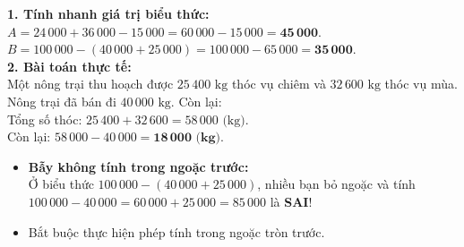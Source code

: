 \documentclass[11pt,a4paper]{article}
\begin{document}
\vspace{-2.5mm}
\noindent
\begin{minipage}[t]{0.49\textwidth}\vspace{0pt}
\begin{tcolorbox}[
  enhanced,
  colback=green!4!white,
  colframe=green!60!black,
  arc=2mm, boxrule=0.8pt,
  left=2mm, right=2mm, top=1.8mm, bottom=1.8mm,
  title={\footnotesize\bfseries\color{white}\faCheckCircle\ Ví dụ thực hành chuẩn mực}
]
{\footnotesize
\textbf{1. Tính nhanh giá trị biểu thức:}\\
$A = 24\,000 + 36\,000 - 15\,000 = 60\,000 - 15\,000 = \mathbf{45\,000}$.\\
$B = 100\,000 - (40\,000 + 25\,000) = 100\,000 - 65\,000 = \mathbf{35\,000}$.\\
\textbf{2. Bài toán thực tế:}\\
Một nông trại thu hoạch được $25\,400\text{ kg}$ thóc vụ chiêm và $32\,600\text{ kg}$ thóc vụ mùa. Nông trại đã bán đi $40\,000\text{ kg}$. Còn lại:\\
Tổng số thóc: $25\,400 + 32\,600 = 58\,000\text{ (kg)}$.\\
Còn lại: $58\,000 - 40\,000 = \mathbf{18\,000\text{ (kg)}}$.
}
\end{tcolorbox}
\end{minipage}
\hfill
\begin{minipage}[t]{0.49\textwidth}\vspace{0pt}
\begin{tcolorbox}[
  enhanced,
  colback=red!4!white,
  colframe=red!70!black,
  arc=2mm, boxrule=0.8pt,
  left=2mm, right=2mm, top=1.8mm, bottom=1.8mm,
  title={\footnotesize\bfseries\color{white}\faExclamationTriangle\ Mẹo tránh bẫy trắc nghiệm}
]
{\footnotesize
\begin{itemize}\setlength{\itemsep}{1.5pt}\setlength{\leftskip}{-2.5mm}
  \item \textbf{Bẫy không tính trong ngoặc trước:}\\
  Ở biểu thức $100\,000 - (40\,000 + 25\,000)$, nhiều bạn bỏ ngoặc và tính $100\,000 - 40\,000 = 60\,000 + 25\,000 = 85\,000$ là \textbf{SAI}!
  \item Bắt buộc thực hiện phép tính trong ngoặc tròn trước.
\end{itemize}
}
\end{tcolorbox}
\end{minipage}
\end{document}
